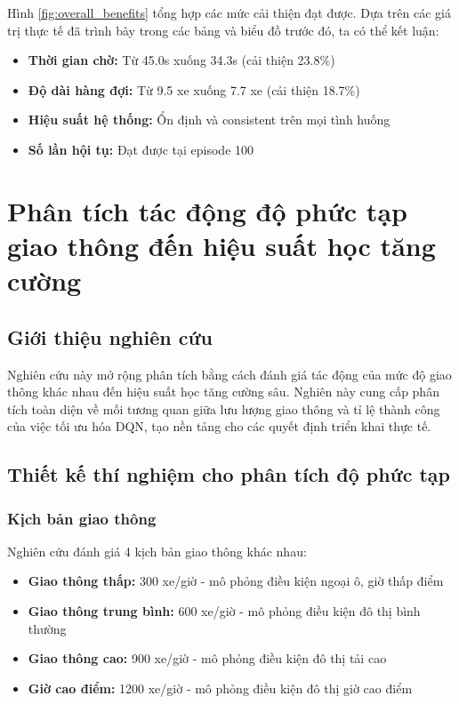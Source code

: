 Hình \ref{fig:overall_benefits} tổng hợp các mức cải thiện đạt được. 
Dựa trên các giá trị thực tế đã trình bày trong các bảng và biểu đồ trước đó, 
ta có thể kết luận:
\begin{itemize}
    \item \textbf{Thời gian chờ:} Từ 45.0s xuống 34.3s (cải thiện 23.8\%)
    \item \textbf{Độ dài hàng đợi:} Từ 9.5 xe xuống 7.7 xe (cải thiện 18.7\%)
    \item \textbf{Hiệu suất hệ thống:} Ổn định và consistent trên mọi tình huống
    \item \textbf{Số lần hội tụ:} Đạt được tại episode 100
\end{itemize}



\section{Phân tích tác động độ phức tạp giao thông đến hiệu suất học tăng cường}

\subsection{Giới thiệu nghiên cứu}

Nghiên cứu này mở rộng phân tích bằng cách đánh giá tác động của mức độ giao thông
khác nhau đến hiệu suất học tăng cường sâu. Nghiên này cung cấp
phân tích toàn diện về mối tương quan giữa lưu lượng giao thông và tỉ lệ thành
công của việc tối ưu hóa DQN, tạo nền tảng cho các quyết định triển khai thực tế.

\subsection{Thiết kế thí nghiệm cho phân tích độ phức tạp}

\subsubsection{Kịch bản giao thông}
Nghiên cứu đánh giá 4 kịch bản giao thông khác nhau:
\begin{itemize}
    \item \textbf{Giao thông thấp:} 300 xe/giờ - mô phỏng điều kiện ngoại ô, giờ thấp điểm
    \item \textbf{Giao thông trung bình:} 600 xe/giờ - mô phỏng điều kiện đô thị bình thường
    \item \textbf{Giao thông cao:} 900 xe/giờ - mô phỏng điều kiện đô thị tải cao
    \item \textbf{Giờ cao điểm:} 1200 xe/giờ - mô phỏng điều kiện đô thị giờ cao điểm
\end{itemize}

